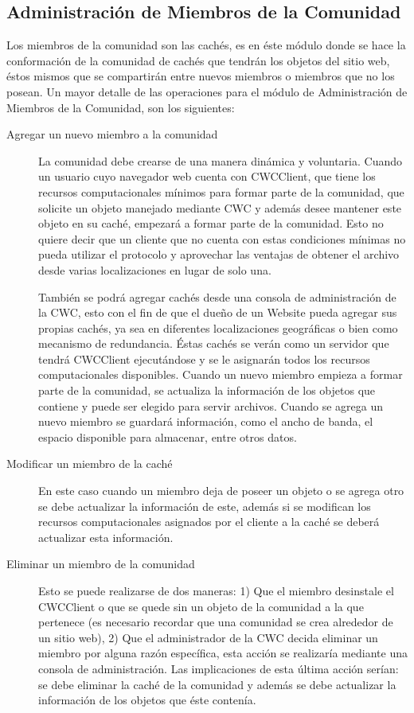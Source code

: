 \subsection{Administración de Miembros de la Comunidad }
Los miembros de la comunidad son las cachés, es en éste módulo donde se hace la conformación de la comunidad de cachés que tendrán los objetos del sitio web, éstos mismos que se compartirán entre nuevos miembros o miembros que no los posean. Un mayor detalle de las operaciones para el módulo de Administración de Miembros de la Comunidad, son los siguientes:

\begin{description}
\item[Agregar un nuevo miembro a la comunidad] La comunidad debe crearse de una manera dinámica y voluntaria. Cuando un usuario cuyo navegador web cuenta con CWCClient, que tiene los recursos computacionales mínimos para formar parte de la comunidad, que solicite un objeto manejado mediante CWC y además desee mantener este objeto en su caché, empezará a formar parte de la comunidad. Esto no quiere decir que un cliente que no cuenta con estas condiciones mínimas no pueda utilizar el protocolo y aprovechar las ventajas de obtener el archivo desde varias localizaciones en lugar de solo una. 

También se podrá agregar cachés desde una consola de administración de la CWC, esto con el fin de que el dueño de un Website pueda agregar sus propias cachés, ya sea en diferentes localizaciones geográficas o bien como mecanismo de redundancia. Éstas cachés se verán como un servidor que tendrá CWCClient ejecutándose y se le asignarán todos los recursos computacionales disponibles. Cuando un nuevo miembro empieza a formar parte de la comunidad, se actualiza la información de los objetos que contiene y puede ser elegido para servir archivos. Cuando se agrega un nuevo miembro se guardará información, como el ancho de banda, el espacio disponible para almacenar, entre otros datos. 

\item[Modificar un miembro de la caché] En este caso cuando un miembro deja de poseer un objeto o se agrega otro se debe actualizar la información de este, además si se modifican los recursos computacionales asignados por el cliente a la caché se deberá actualizar esta información.

\item[Eliminar un miembro de la comunidad] Esto se puede realizarse de dos maneras: 1) Que el miembro desinstale el CWCClient o que se quede sin un objeto de la comunidad a la que pertenece (es necesario recordar  que una comunidad se crea alrededor de un sitio web), 2) Que el administrador de la CWC decida eliminar un miembro por alguna razón específica, esta acción se realizaría mediante una consola de administración. Las implicaciones de esta última acción serían: se debe eliminar la caché de la comunidad y además se debe actualizar la información de los objetos que éste contenía.


\end{description}
